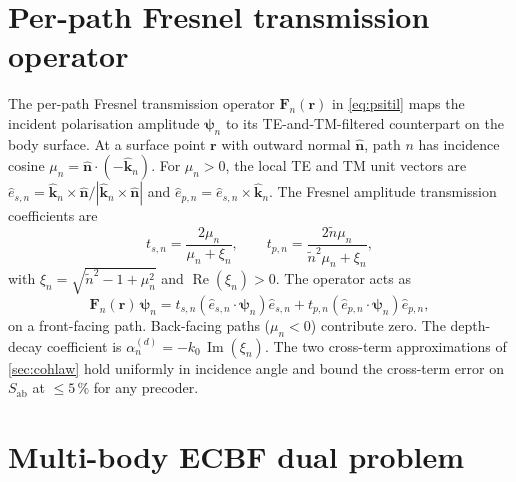 \documentclass[journal,twocolumn,10pt]{IEEEtran}
\theoremstyle{plain}
\theoremstyle{remark}
\newcommand{\khat}{\hat{\bm{k}}}
\newcommand{\nhat}{\hat{\bm{n}}}
\newcommand{\rr}{\mathbf{r}}
\newcommand{\Sab}{S_{\mathrm{ab}}}
\newcommand{\Fn}{\mathbf{F}_n}
\newcommand{\psin}{\bm{\psi}_n}
\newcommand{\ntilde}{\tilde{n}}
\DeclareMathOperator{\RE}{Re}
\DeclareMathOperator{\IM}{Im}
\begin{document}
\section{Per-path Fresnel transmission operator}\label{app:fresnel}

The per-path Fresnel transmission operator $\Fn(\rr)$ in
\cref{eq:psitil} maps the incident polarisation amplitude $\psin$ to
its TE-and-TM-filtered counterpart on the body surface. At a surface
point $\rr$ with outward normal $\nhat$, path $n$ has incidence
cosine $\mu_n = \nhat \cdot (-\khat_n)$. For $\mu_n > 0$, the local
TE and TM unit vectors are $\hat{e}_{s,n} =
\khat_n \times \nhat / |\khat_n \times \nhat|$ and
$\hat{e}_{p,n} = \hat{e}_{s,n} \times \khat_n$. The Fresnel
amplitude transmission coefficients are
\begin{equation}\label{eq:t-coef-app}
  t_{s,n} = \frac{2 \mu_n}{\mu_n + \xi_n},
  \qquad
  t_{p,n} = \frac{2 \ntilde \mu_n}{\ntilde^2 \mu_n + \xi_n},
\end{equation}
with $\xi_n = \sqrt{\ntilde^2 - 1 + \mu_n^2}$ and $\RE(\xi_n) > 0$.
The operator acts as
\begin{equation}\label{eq:F-action}
  \Fn(\rr)\,\psin = t_{s,n}(\hat{e}_{s,n} \cdot \psin) \hat{e}_{s,n}
  + t_{p,n}(\hat{e}_{p,n} \cdot \psin) \hat{e}_{p,n},
\end{equation}
on a front-facing path. Back-facing paths ($\mu_n < 0$) contribute
zero. The depth-decay coefficient is
$\alpha_n^{(d)} = -k_0\,\IM(\xi_n)$. The two cross-term
approximations of \cref{sec:cohlaw} hold uniformly in incidence
angle and bound the cross-term error on $\Sab$ at $\leq 5\,\%$ for
any precoder.


\section{Multi-body ECBF dual problem}\label{app:ecbf}
\end{document}
